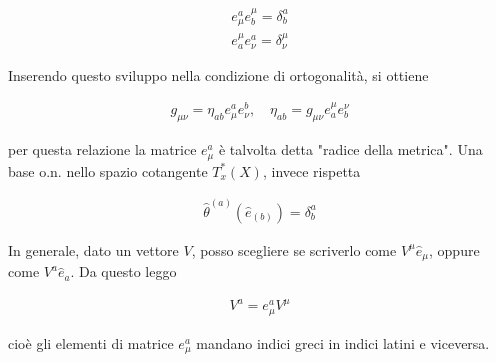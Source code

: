 \documentclass{report}
\begin{document}
\begin{align}
    e^a_\mu e^\mu_b = \delta^a_b \\
    e^\mu_a e^a_\nu = \delta^\mu_\nu
\end{align}

Inserendo questo sviluppo nella condizione di ortogonalità, si ottiene 

\begin{align}
    g_{\mu\nu} = \eta_{ab}e^a_\mu e^b_\nu, \quad \eta_{ab} = g_{\mu\nu}e^\mu_a e^\nu_b
\end{align}

per questa relazione la matrice \(e^a_\mu\) è talvolta detta "radice della metrica". Una base o.n. nello spazio cotangente \(T^*_x(X)\), invece rispetta 

\begin{align}
    \hat{\theta}^{(a)}(\hat{e}_{(b)}) = \delta^a_b
\end{align}


In generale, dato un vettore \(V\), posso scegliere se scriverlo come \(V^\mu \hat{e}_\mu\), oppure come \(V^a \hat{e}_a\). Da questo leggo 

\begin{align}
    V^a = e^a_\mu V^\mu
\end{align}

cioè gli elementi di matrice \(e^a_\mu\) mandano indici greci in indici latini e viceversa. 
\end{document}
